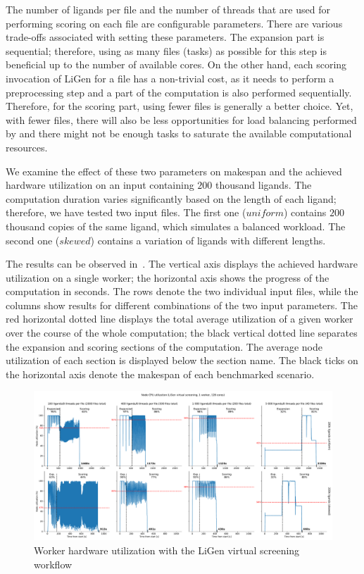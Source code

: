 The number of ligands per file and the number of threads that are used for performing scoring on
each file are configurable parameters. There are various trade-offs associated with setting these
parameters. The expansion part is sequential; therefore, using as many files (tasks) as possible
for this step is beneficial up to the number of available cores. On the other hand, each scoring
invocation of LiGen for a file has a non-trivial cost, as it needs to perform a preprocessing step
and a part of the computation is also performed sequentially. Therefore, for the scoring part,
using fewer files is generally a better choice. Yet, with fewer files, there will also be less
opportunities for load balancing performed by \hq{} and there might not be enough
tasks to saturate the available computational resources.

We examine the effect of these two parameters on makespan and the achieved hardware utilization on
an input containing $200$ thousand ligands. The computation duration varies
significantly based on the length of each ligand; therefore, we have tested two input files. The
first one ($uniform$) contains $200$ thousand copies of the same
ligand, which simulates a balanced workload. The second one ($skewed$) contains a
variation of ligands with different lengths.

The results can be observed in~. The vertical axis displays the achieved
hardware utilization on a single worker; the horizontal axis shows the progress of the computation
in seconds. The rows denote the two individual input files, while the columns show results for
different combinations of the two input parameters. The red horizontal dotted line displays the
total average utilization of a given worker over the course of the whole computation; the black
vertical dotted line separates the expansion and scoring sections of the computation. The average
node utilization of each section is displayed below the section name. The black ticks on the
horizontal axis denote the makespan of each benchmarked scenario.

\begin{figure}[h]
	\centering
	\includegraphics[width=\textwidth]{imgs/hq/charts/ligen-aggregation-utilization}
	\caption{Worker hardware utilization with the LiGen virtual screening workflow}
	\label{fig:hq-ligen-utilization}
\end{figure}

